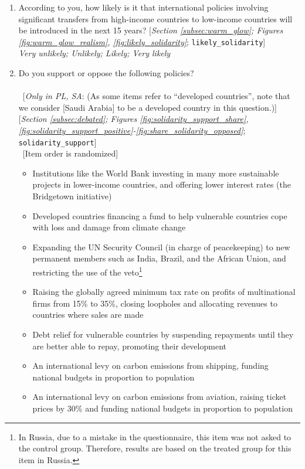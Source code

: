 \begin{enumerate}[resume]
\item  \label{q:likely_solidarity} According to you, how likely is it that international policies involving significant transfers from high-income countries to low-income countries will be introduced in the next 15 years? [\textit{Section \ref{subsec:warm_glow}; Figures \ref{fig:warm_glow_realism}, \ref{fig:likely_solidarity}}; 
\verb|likely_solidarity|]
  \\ \textit{Very unlikely; Unlikely; Likely; Very likely}

\item  \label{q:solidarity_support} Do you support or oppose the following policies?\\
~\\ 
~[\textit{Only in PL, SA}: (As some items refer to ``developed countries'', note that we consider [Saudi Arabia] to be a developed country in this question.)] [\textit{Section \ref{subsec:debated}; Figures \ref{fig:solidarity_support_share}, \ref{fig:solidarity_support_positive}-\ref{fig:share_solidarity_opposed}}; 
\verb|solidarity_support|] \\
~[Item order is randomized]
\begin{itemize}
    \item Institutions like the World Bank investing in many more sustainable projects in lower-income countries, and offering lower interest rates (the Bridgetown initiative)
    \item Developed countries financing a fund to help vulnerable countries cope with loss and damage from climate change
    \item Expanding the UN Security Council (in charge of peacekeeping) to new permanent members such as India, Brazil, and the African Union, and restricting the use of the veto\footnote{In Russia, due to a mistake in the questionnaire, this item was not asked to the control group. Therefore, results are based on the treated group for this item in Russia. }
    \item Raising the globally agreed minimum tax rate on profits of multinational firms from 15\% to 35\%, closing loopholes and allocating revenues to countries where sales are made
    \item Debt relief for vulnerable countries by suspending repayments until they are better able to repay, promoting their development
    \item An international levy on carbon emissions from shipping, funding national budgets in proportion to population
    \item An international levy on carbon emissions from aviation, raising ticket prices by 30\% and funding national budgets in proportion to population

\end{itemize}
\end{enumerate}

